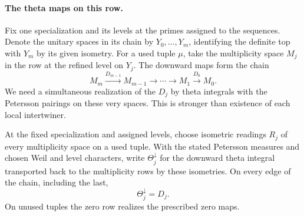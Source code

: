 \paragraph{The theta maps on this row.}
Fix one specialization and its levels at the primes assigned to the sequences. Denote the
unitary spaces in its chain by \(Y_0,\ldots,Y_m\), identifying
the definite top with \(Y_m\) by its given isometry. For a used tuple \(\mu\), take the multiplicity space \(M_j\) in the row at the refined level on \(Y_j\). The downward maps form the chain
\[
 M_m\xrightarrow{D_{m-1}}M_{m-1}\longrightarrow\cdots\longrightarrow M_1\xrightarrow{D_0}M_0 .
\] We need a simultaneous realization of the \(D_j\) by theta
integrals with the Petersson pairings on these very spaces.
This is stronger than existence of each local intertwiner.

\begin{proposition}\label{prop:isometric-refined-theta-chain}
At the fixed specialization and assigned levels, choose
isometric readings \(R_j\) of every multiplicity space on
a used tuple. With the stated Petersson measures and chosen
Weil and level characters, write \(\Theta_j^{\downarrow}\) for the downward theta integral transported back to the multiplicity rows by these isometries. On every edge of the chain, including the last,
\[
 \Theta_j^{\downarrow}=D_j.
\] On unused tuples the zero row realizes the
prescribed zero maps.
\end{proposition}

